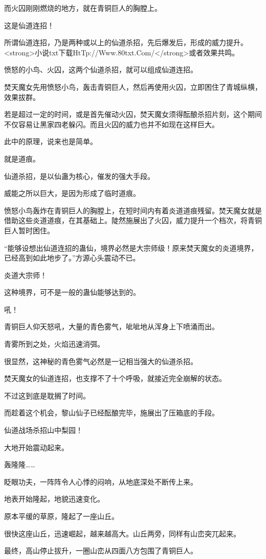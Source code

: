 \begin{this_body}
而火囚刚刚燃烧的地方，就在青铜巨人的胸膛上。

这是仙道连招！

所谓仙道连招，乃是两种或以上的仙道杀招，先后爆发后，形成的威力提升。<strong>小说txt下载HtTp://Www.80txt.Com/</strong>或者效果共鸣。

愤怒的小鸟、火囚，这两个仙道杀招，就可以组成仙道连招。

焚天魔女先用愤怒小鸟，轰击青铜巨人，然后再使用火囚，立即困住了青城纵横，效果拔群。

若是超过一定的时间，或是首先催动火囚，焚天魔女须得酝酿杀招片刻，这个期间不仅容易让黑家四老躲闪。而且火囚的威力也并不如现在这样巨大。

此中的原理，说来也是简单。

就是道痕。

仙道杀招，是以仙蛊为核心，催发的强大手段。

威能之所以巨大，是因为形成了临时道痕。

愤怒小鸟轰炸在青铜巨人的胸膛上，在短时间内有着炎道道痕残留。焚天魔女就是借助这些炎道道痕，在其基础上。陡然施展出了火囚，威力提升一个档次，将青铜巨人暂时困住。

“能够设想出仙道连招的蛊仙，境界必然是大宗师级！原来焚天魔女的炎道境界，已经高到如此地步了。”方源心头震动不已。

炎道大宗师！

这种境界，可不是一般的蛊仙能够达到的。

吼！

青铜巨人仰天怒吼，大量的青色雾气，呲呲地从浑身上下喷涌而出。

青雾所到之处，火焰迅速消弭。

很显然，这神秘的青色雾气必然是一记相当强大的仙道杀招。

焚天魔女的仙道连招，也支撑不了十个呼吸，就接近完全崩解的状态。

不过这到底是耽搁了时间。

而趁着这个机会，黎山仙子已经酝酿完毕，施展出了压箱底的手段。

仙道战场杀招山中梨园！

大地开始震动起来。

轰隆隆……

眨眼功夫，一阵阵令人心悸的闷响，从地底深处不断传上来。

地表开始隆起，地貌迅速变化。

原本平缓的草原，隆起了一座山丘。

很快这座山丘，迅速崛起，越来越高大。山丘两旁，同样有山峦突兀起来。

最终，高山停止拔升，一圈山峦从四面八方包围了青铜巨人。


\end{this_body}
